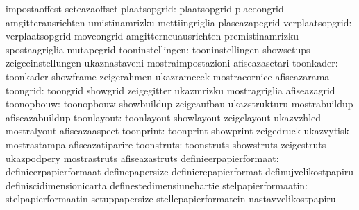                                   impostaoffest                    seteazaoffset
                    plaatsopgrid: plaatsopgrid                     placeongrid
                                  amgitterausrichten               umistinamrizku
                                  mettiingriglia                   plaseazapegrid
                 verplaatsopgrid: verplaatsopgrid                  moveongrid
                                  amgitterneuausrichten            premistinamrizku
                                  spostaagriglia                   mutapegrid
                tooninstellingen: tooninstellingen                 showsetups
                                  zeigeeinstellungen               ukaznastaveni
                                  mostraimpostazioni               afiseazasetari
                       toonkader: toonkader                        showframe
                                  zeigerahmen                      ukazramecek
                                  mostracornice                    afiseazarama
                        toongrid: toongrid                         showgrid
                                  zeigegitter                      ukazmrizku
                                  mostragriglia                    afiseazagrid
                      toonopbouw: toonopbouw                       showbuildup
                                  zeigeaufbau                      ukazstrukturu
                                  mostrabuildup                    afiseazabuildup
                      toonlayout: toonlayout                       showlayout
                                  zeigelayout                      ukazvzhled
                                  mostralyout                      afiseazaaspect
                       toonprint: toonprint                        showprint
                                  zeigedruck                       ukazvytisk
                                  mostrastampa                     afiseazatiparire
                      toonstruts: toonstruts                       showstruts
                                  zeigestruts                      ukazpodpery
                                  mostrastruts                     afiseazastruts
          definieerpapierformaat: definieerpapierformaat           definepapersize
                                  definierepapierformat            definujvelikostpapiru
                                  definiscidimensionicarta         definestedimensiunehartie
             stelpapierformaatin: stelpapierformaatin              setuppapersize
                                  stellepapierformatein            nastavvelikostpapiru
